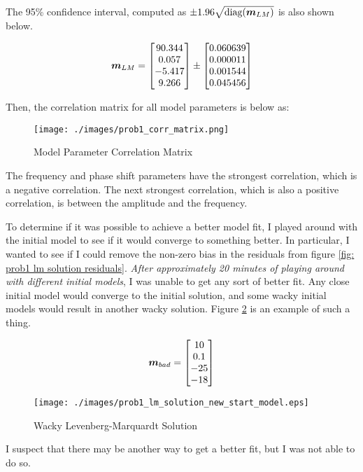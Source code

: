 The 95\% confidence interval, computed as $\pm 1.96 \sqrt{\textrm{diag}(\boldsymbol{m}_{LM})}$ is also shown below. 

\begin{align*}
	\boldsymbol{m}_{LM} = \begin{bmatrix} 90.344 \\ 0.057 \\ -5.417 \\ 9.266 \end{bmatrix} \pm \begin{bmatrix} 0.060639 \\ 0.000011 \\ 0.001544 \\ 0.045456 \end{bmatrix}
\end{align*}

Then, the correlation matrix for all model parameters is below as:

\begin{figure}[h] 
	\centering
	\texttt{[image: ./images/prob1\_corr\_matrix.png]}
	\caption{Model Parameter Correlation Matrix}
	\label{fig: prob1 correlation matrix}
\end{figure}
\FloatBarrier

The frequency and phase shift parameters have the strongest correlation, which is a negative correlation. The next strongest correlation, which is also a positive correlation, is between the amplitude and the frequency. 

To determine if it was possible to achieve a better model fit, I played around with the initial model to see if it would converge to something better. In particular, I wanted to see if I could remove the non-zero bias in the residuals from figure \ref{fig: prob1 lm solution residuals}. \textit{After approximately 20 minutes of playing around with different initial models}, I was unable to get any sort of better fit. Any close initial model would converge to the initial solution, and some wacky initial models would result in another wacky solution. Figure \ref{fig: prob1 wacky lm solution} is an example of such a thing. 

\begin{align*}
	\boldsymbol{m}_{bad} = \begin{bmatrix} 10 \\ 0.1 \\ -25 \\ -18 \end{bmatrix}
\end{align*}

\begin{figure}[h] 
	\centering
	\texttt{[image: ./images/prob1\_lm\_solution\_new\_start\_model.eps]}
	\caption{Wacky Levenberg-Marquardt Solution}
	\label{fig: prob1 wacky lm solution}
\end{figure}
\FloatBarrier

I suspect that there may be another way to get a better fit, but I was not able to do so. 

